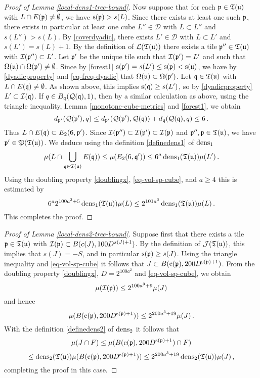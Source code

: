 {\begin{proof}[Proof of Lemma \ref{local-dens1-tree-bound}]
    Now suppose that for each ${\mathfrak p} \in {\mathfrak T}({\mathfrak u})$ with $L \cap E({\mathfrak p}) \ne \emptyset$, we have ${\mathrm{s}}({\mathfrak p}) > s(L)$. Since there exists at least one such ${\mathfrak p}$, there exists in particular at least one cube $L'' \in \mathcal{D}$ with $L \subset L''$ and $s(L'') > s(L)$. By \eqref{coverdyadic}, there exists $L' \in \mathcal{D}$ with $L \subset L'$ and $s(L') = s(L) + 1$. By the definition of $\mathcal{L}({\mathfrak T}({\mathfrak u}))$ there exists a tile ${\mathfrak p}'' \in {\mathfrak T}({\mathfrak u})$ with ${\mathcal{I}}({\mathfrak p}'') \subset L'$. Let ${\mathfrak p}'$ be the unique tile such that ${\mathcal{I}}({\mathfrak p}') = L'$ and such that $\Omega({\mathfrak u}) \cap \Omega({\mathfrak p}') \ne \emptyset$. Since by \eqref{forest1} ${\mathrm{s}}({\mathfrak p}') = s(L') \le {\mathrm{s}}({\mathfrak p}) < {\mathrm{s}}({\mathfrak u})$, we have by \eqref{dyadicproperty} and \eqref{eq-freq-dyadic} that $\Omega({\mathfrak u}) \subset \Omega({\mathfrak p}')$. Let ${\mathfrak q} \in {\mathfrak T}({\mathfrak u})$ with $L \cap E({\mathfrak q}) \ne \emptyset$. As shown above, this implies ${\mathrm{s}}({\mathfrak q}) \ge s(L')$, so by \eqref{dyadicproperty} $L' \subset {\mathcal{I}}({\mathfrak q})$. If $q \in B_{{\mathfrak q}}({\mathcal{Q}}({\mathfrak q}), 1)$, then by a similar calculation as above, using the triangle inequality, Lemma \ref{monotone-cube-metrics} and \eqref{forest1}, we obtain
    $$
        d_{{\mathfrak p}'}({\mathcal{Q}}({\mathfrak p}'), q) \le d_{{\mathfrak p}'}({\mathcal{Q}}({\mathfrak p}'), {\mathcal{Q}}({\mathfrak q})) + d_{{\mathfrak q}}({\mathcal{Q}}({\mathfrak q}), q) \le 6\,.
    $$
    Thus $L \cap E({\mathfrak q}) \subset E_2(6, {\mathfrak p}')$. Since ${\mathcal{I}}({\mathfrak p}'') \subset {\mathcal{I}}({\mathfrak p}') \subset {\mathcal{I}}({\mathfrak p})$ and ${\mathfrak p}'', {\mathfrak p} \in {\mathfrak T}({\mathfrak u})$, we have ${\mathfrak p}' \in {\mathfrak P}({\mathfrak T}({\mathfrak u}))$. We deduce using the definition \eqref{definedens1} of $\operatorname{\operatorname{dens}}_1$
    $$
        \mu(L \cap \bigcup_{{\mathfrak q} \in {\mathfrak T}({\mathfrak u})} E({\mathfrak q})) \le \mu(E_2(6, {\mathfrak q}')) \le 6^a \operatorname{\operatorname{dens}}_1({\mathfrak T}({\mathfrak u})) \mu(L')\,.
    $$
    Using the doubling property \eqref{doublingx}, \eqref{eq-vol-sp-cube}, and $a \ge 4$ this is estimated by
    $$
        6^a 2^{100a^3 + 5}\operatorname{\operatorname{dens}}_1({\mathfrak T}({\mathfrak u})) \mu(L) \le 2^{101 a^3} \operatorname{\operatorname{dens}}_1({\mathfrak T}({\mathfrak u}))\mu(L)\,.
    $$
    This completes the proof.
\end{proof}

\begin{proof}[Proof of Lemma \ref{local-dens2-tree-bound}]
    Suppose first that there exists a tile ${\mathfrak p} \in {\mathfrak T}({\mathfrak u})$ with ${\mathcal{I}}({\mathfrak p}) \subset B(c(J), 100 D^{s(J) + 1})$. By the definition of $\mathcal{J}({\mathfrak T}({\mathfrak u}))$, this implies that $s(J) = -S$, and in particular ${\mathrm{s}}({\mathfrak p}) \ge s(J)$. Using the triangle inequality and \eqref{eq-vol-sp-cube} it follows that $J \subset B({\mathrm{c}}({\mathfrak p}), 200 D^{{\mathrm{s}}({\mathfrak p}) + 1})$. From the doubling property \eqref{doublingx}, $D=2^{100a^2}$ and \eqref{eq-vol-sp-cube}, we obtain
    $$
        \mu({\mathcal{I}}({\mathfrak p})) \le 2^{100a^3 + 9} \mu(J)
    $$
    and hence
    $$
        \mu( B({\mathrm{c}}({\mathfrak p}), 200 D^{{\mathrm{s}}({\mathfrak p}) + 1})) \le 2^{200a^3 +19} \mu(J)\,.
    $$
    With the definition \eqref{definedens2} of $\operatorname{\operatorname{dens}}_2$ it follows that
    $$
        \mu(J \cap F) \le \mu( B({\mathrm{c}}({\mathfrak p}), 200 D^{{\mathrm{s}}({\mathfrak p}) + 1}) \cap F)
    $$
    $$
        \le \operatorname{\operatorname{dens}}_2({\mathfrak T}({\mathfrak u})) \mu( B({\mathrm{c}}({\mathfrak p}), 200 D^{{\mathrm{s}}({\mathfrak p}) + 1})) \le 2^{200a^3 +19} \operatorname{\operatorname{dens}}_2({\mathfrak T}({\mathfrak u}))\mu(J)\,,
    $$
    completing the proof in this case.


\end{proof}}
